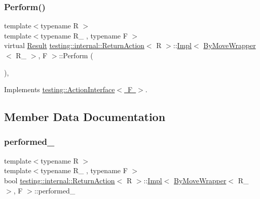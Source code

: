 \subsubsection{\texorpdfstring{Perform()}{Perform()}\hspace{0.1cm}{\footnotesize\ttfamily [3/3]}}
{\footnotesize\ttfamily template$<$typename R $>$ \\
template$<$typename R\+\_\+ , typename F $>$ \\
virtual \mbox{\hyperlink{classtesting_1_1_action_interface_a7477de2fe3e4e01c59db698203acaee7}{Result}} \mbox{\hyperlink{classtesting_1_1internal_1_1_return_action}{testing\+::internal\+::\+Return\+Action}}$<$ R $>$\+::\mbox{\hyperlink{classtesting_1_1internal_1_1_return_action_1_1_impl}{Impl}}$<$ \mbox{\hyperlink{structtesting_1_1internal_1_1_by_move_wrapper}{By\+Move\+Wrapper}}$<$ R\+\_\+ $>$, F $>$\+::Perform (\begin{DoxyParamCaption}\item[{const \mbox{\hyperlink{classtesting_1_1_action_interface_af72720d864da4d606629e83edc003511}{Argument\+Tuple}} \&}]{ }\end{DoxyParamCaption})\hspace{0.3cm}{\ttfamily [inline]}, {\ttfamily [virtual]}}



Implements \mbox{\hyperlink{classtesting_1_1_action_interface_a20f8624fcea1786f2992b358760422a0}{testing\+::\+Action\+Interface$<$ F $>$}}.



\subsection{Member Data Documentation}
\mbox{\label{classtesting_1_1internal_1_1_return_action_1_1_impl_3_01_by_move_wrapper_3_01_r___01_4_00_01_f_01_4_adb9db786f4a87a4a8a055ddc840f9d77}} 
\subsubsection{\texorpdfstring{performed\_}{performed\_}}
{\footnotesize\ttfamily template$<$typename R $>$ \\
template$<$typename R\+\_\+ , typename F $>$ \\
bool \mbox{\hyperlink{classtesting_1_1internal_1_1_return_action}{testing\+::internal\+::\+Return\+Action}}$<$ R $>$\+::\mbox{\hyperlink{classtesting_1_1internal_1_1_return_action_1_1_impl}{Impl}}$<$ \mbox{\hyperlink{structtesting_1_1internal_1_1_by_move_wrapper}{By\+Move\+Wrapper}}$<$ R\+\_\+ $>$, F $>$\+::performed\+\_\+\hspace{0.3cm}{\ttfamily [private]}}

